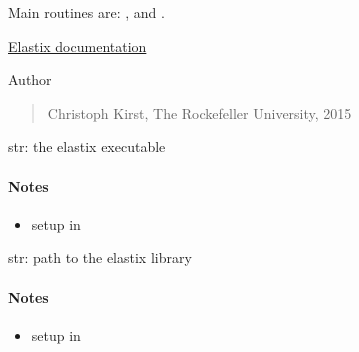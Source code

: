 \documentclass[letterpaper,10pt,english]{sphinxmanual}
\begin{document}
Main routines are: {\hyperref[api/ClearMap.Alignment:ClearMap.Alignment.Elastix.alignData]{\emph{}}}, {\hyperref[api/ClearMap.Alignment:ClearMap.Alignment.Elastix.transformData]{\emph{}}} and {\hyperref[api/ClearMap.Alignment:ClearMap.Alignment.Elastix.transformPoints]{\emph{}}}.




\href{http://elastix.isi.uu.nl/}{Elastix documentation}
{\hyperref[api/ClearMap.Alignment:module-ClearMap.Alignment.Resampling]{\emph{}}}



Author
\begin{quote}

Christoph Kirst, The Rockefeller University, 2015
\end{quote}

\begin{fulllineitems}
\label{api/ClearMap.Alignment:ClearMap.Alignment.Elastix.ElastixBinary}
str: the elastix executable
\paragraph{Notes}
\begin{itemize}
\item {} 
setup in {\hyperref[api/ClearMap.Alignment:ClearMap.Alignment.Elastix.initializeElastix]{\emph{}}}

\end{itemize}

\end{fulllineitems}


\begin{fulllineitems}
\label{api/ClearMap.Alignment:ClearMap.Alignment.Elastix.ElastixLib}
str: path to the elastix library
\paragraph{Notes}
\begin{itemize}
\item {} 
setup in {\hyperref[api/ClearMap.Alignment:ClearMap.Alignment.Elastix.initializeElastix]{\emph{}}}

\end{itemize}

\end{fulllineitems}
\end{document}
